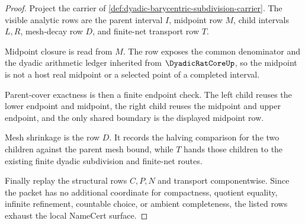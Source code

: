 \begin{proof}
Project the carrier of \autoref{def:dyadic-barycentric-subdivision-carrier}. The visible analytic rows are the parent interval $I$, midpoint row $M$, child intervals $L,R$, mesh-decay row $D$, and finite-net transport row $T$.

Midpoint closure is read from $M$. The row exposes the common denominator and the dyadic arithmetic ledger inherited from $\DyadicRatCoreUp$, so the midpoint is not a host real midpoint or a selected point of a completed interval.

Parent-cover exactness is then a finite endpoint check. The left child reuses the lower endpoint and midpoint, the right child reuses the midpoint and upper endpoint, and the only shared boundary is the displayed midpoint row.

Mesh shrinkage is the row $D$. It records the halving comparison for the two children against the parent mesh bound, while $T$ hands those children to the existing finite dyadic subdivision and finite-net routes.

Finally replay the structural rows $C,P,N$ and transport componentwise. Since the packet has no additional coordinate for compactness, quotient equality, infinite refinement, countable choice, or ambient completeness, the listed rows exhaust the local NameCert surface.
\end{proof}

